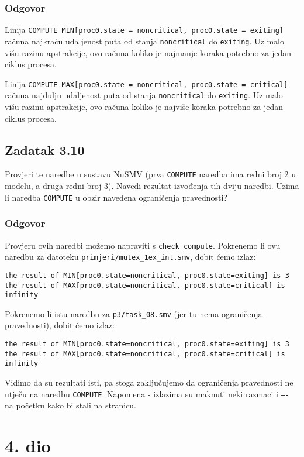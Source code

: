 \documentclass{article}
\newcommand{\code}[1]{\colorbox{blue!15}{\texttt{#1}}}
\newcommand{\odgovor}{\subsubsection*{Odgovor}}
\newcommand{\zadatak}[1]{\subsection{Zadatak #1}}
\begin{document}
\odgovor

Linija \code{COMPUTE MIN[proc0.state = noncritical, proc0.state = exiting]} računa najkraću udaljenost puta od stanja \code{noncritical} do \code{exiting}. Uz malo višu razinu apstrakcije, ovo računa koliko je najmanje koraka potrebno za jedan ciklus procesa.
\newline

\noindent
Linija \code{COMPUTE MAX[proc0.state = noncritical, proc0.state = critical]} računa najdulju udaljenost puta od stanja \code{noncritical} do \code{exiting}. Uz malo višu razinu apstrakcije, ovo računa koliko je najviše koraka potrebno za jedan ciklus procesa.


\zadatak{3.10}

Provjeri te naredbe u sustavu NuSMV (prva \code{COMPUTE} naredba ima redni broj 2 u modelu, a druga redni broj 3). Navedi rezultat izvođenja tih dviju naredbi. Uzima li naredba \code{COMPUTE} u obzir navedena ograničenja pravednosti?

\odgovor

Provjeru ovih naredbi možemo napraviti s \code{check\_compute}. Pokrenemo li ovu naredbu za datoteku \code{primjeri/mutex\_1ex\_int.smv}, dobit ćemo izlaz:

\begin{verbatim}
the result of MIN[proc0.state=noncritical, proc0.state=exiting] is 3
the result of MAX[proc0.state=noncritical, proc0.state=critical] is infinity
\end{verbatim}

\noindent
Pokrenemo li istu naredbu za \code{p3/task\_08.smv} (jer tu nema ograničenja pravednosti), dobit ćemo izlaz:

\begin{verbatim}
the result of MIN[proc0.state=noncritical, proc0.state=exiting] is 3
the result of MAX[proc0.state=noncritical, proc0.state=critical] is infinity
\end{verbatim}

\noindent
Vidimo da su rezultati isti, pa stoga zaključujemo da ograničenja pravednosti ne utječu na naredbu \code{COMPUTE}. Napomena - izlazima su maknuti neki razmaci i \code{---- } na početku kako bi stali na stranicu.
\pagebreak




\section{4. dio}
\end{document}

